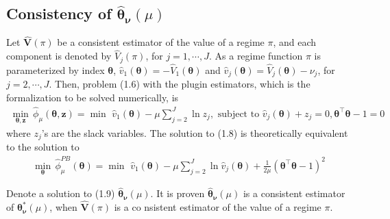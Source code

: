 \documentclass[12pt]{article}
\newcommand{\wh}{\widehat}
\newcommand{\itl}{\intercal}
\newcommand{\bs}{ \boldsymbol}
\newcommand{\lt}{\left}
\newcommand{\rt}{\right}
\begin{document}
\subsection{Consistency of $\wh{\bs{\theta}}_{\bs{\nu}}\lt(\mu\rt)$}
Let $\wh{\bs{V}}(\pi)$ be a consistent estimator of the value of a regime $\pi$, and each component is denoted by $\wh{V}_j(\pi)$, for $j = 1, \cdots, J$. As a regime function $\pi$ is parameterized by index $\bs{\theta}$,  $\wh{v}_1\lt(\bs{\theta}\rt)=-\wh{V}_1\lt(\bs{\theta}\rt)$ and  $\wh{v}_j\lt(\bs{\theta}\rt) = \wh{V}_j\lt(\bs{\theta}\rt) - \nu_j$, for $j = 2, \cdots, J$. Then, problem (1.6) with the plugin estimators, which is the formalization to be solved numerically, is 
\begin{equation}
\begin{gathered}
\min_{\bs{\theta}, \bs{z}} \, \wh{\phi}_{\mu}(\bs{\theta}, \bs{z}) = \min \,\,\wh{v}_1(\bs{\theta}) - \mu \sum_{j=2}^J \ln z_j, \text{ subject to } \wh{v}_j(\bs{\theta})  + z_j = 0, \bs{\theta}^{\itl}\bs{\theta} - 1= 0
\end{gathered}
\end{equation}
where $z_j$'s are the slack variables. The solution to (1.8) is theoretically equivalent to the solution to 
\begin{equation}
\begin{gathered}
\min_{\bs{\theta}} \, \wh{\phi}^{PB}_{\mu}\lt(\bs{\theta}\rt) = \min \,\,\wh{v}_1(\bs{\theta}) - \mu \sum_{j=2}^J \ln \wh{v}_j\lt( \bs{\theta}\rt) + \frac{1}{2\mu} \lt(\bs{\theta}^{\itl}\bs{\theta} - 1\rt)^2
\end{gathered}
\end{equation} 

Denote a solution to (1.9) $\wh{\bs{\theta}}_{\bs{\nu}}\lt(\mu\rt)$. It is proven $\wh{\bs{\theta}}_{\bs{\nu}}\lt(\mu\rt)$ is a consistent estimator of $\bs{\theta}^*_{\bs{\nu}}\lt(\mu\rt)$, when $\wh{\bs{V}}(\pi)$ is a co  nsistent estimator of the value of a regime $\pi$.



\end{document}
